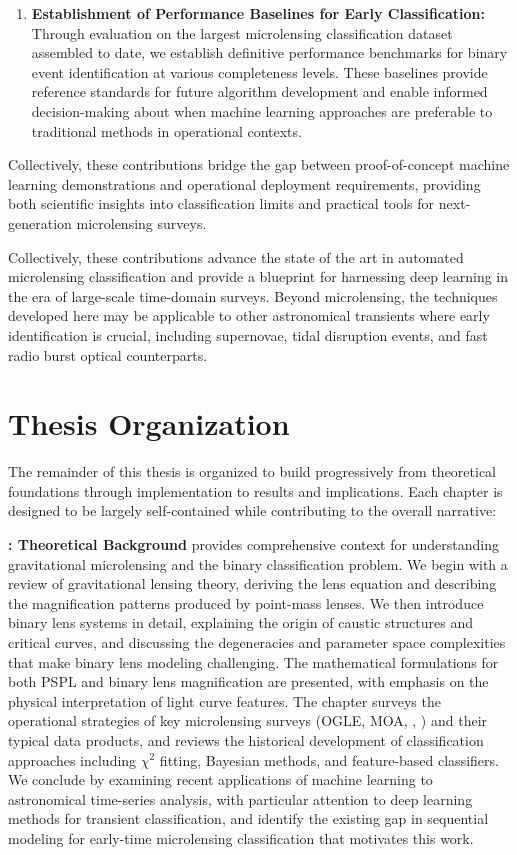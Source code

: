 \begin{enumerate}
    \item \textbf{Establishment of Performance Baselines for Early Classification:} Through evaluation on the largest microlensing classification dataset assembled to date, we establish definitive performance benchmarks for binary event identification at various completeness levels. These baselines provide reference standards for future algorithm development and enable informed decision-making about when machine learning approaches are preferable to traditional methods in operational contexts.
\end{enumerate}

Collectively, these contributions bridge the gap between proof-of-concept machine learning demonstrations and operational deployment requirements, providing both scientific insights into classification limits and practical tools for next-generation microlensing surveys.

Collectively, these contributions advance the state of the art in automated microlensing classification and provide a blueprint for harnessing deep learning in the era of large-scale time-domain surveys. Beyond microlensing, the techniques developed here may be applicable to other astronomical transients where early identification is crucial, including supernovae, tidal disruption events, and fast radio burst optical counterparts.

\section{Thesis Organization}
\label{sec:organization}

The remainder of this thesis is organized to build progressively from theoretical foundations through implementation to results and implications. Each chapter is designed to be largely self-contained while contributing to the overall narrative:

\textbf{: Theoretical Background} provides comprehensive context for understanding gravitational microlensing and the binary classification problem. We begin with a review of gravitational lensing theory, deriving the lens equation and describing the magnification patterns produced by point-mass lenses. We then introduce binary lens systems in detail, explaining the origin of caustic structures and critical curves, and discussing the degeneracies and parameter space complexities that make binary lens modeling challenging. The mathematical formulations for both PSPL and binary lens magnification are presented, with emphasis on the physical interpretation of light curve features. The chapter surveys the operational strategies of key microlensing surveys (OGLE, MOA, \romantel, \lsst) and their typical data products, and reviews the historical development of classification approaches including $\chi^2$ fitting, Bayesian methods, and feature-based classifiers. We conclude by examining recent applications of machine learning to astronomical time-series analysis, with particular attention to deep learning methods for transient classification, and identify the existing gap in sequential modeling for early-time microlensing classification that motivates this work.

